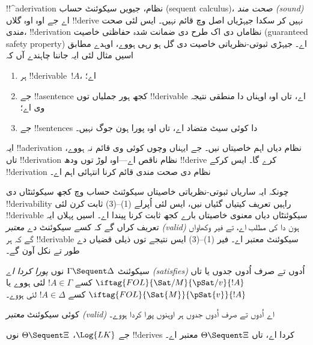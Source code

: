 \documentclass[../../../include/open-logic-section]{subfiles}
\begin{document}
      {}
      {}


\begin{explain}
!!^a{derivation} نظام، جیویں سیکوئنٹ حساب (sequent calculus)، 
\emph{صحت مند (sound)} اے جے اوہ اوہ گلاں !!{derive} نہیں کر سکدا جیہڑیاں
اصل وچ قائم نہیں۔ ایس لئی صحت مندی، !!{derivation} نظاماں دی اک طرح دی
ضمانت شدہ حفاظتی خاصیت (guaranteed safety property) اے۔ جیہڑی
ثبوتی-نظریاتی خاصیت دی گل ہو رہی ہووے، اوہدے مطابق اسیں مثال لئی ایہ جاننا
چاہندے آں کہ
\begin{enumerate}
\item ہر !!{derivable}~$!A$،  اے؛
\item جے !!a{sentence} کجھ ہور جملیاں توں !!{derivable} اے، تاں اوہ اوہناں دا
  منطقی نتیجہ وی اے؛
\item جے !!{sentence}s دا کوئی سیٹ متضاد اے، تاں اوہ پورا ہون جوگ نہیں۔
\end{enumerate}
ایہ !!a{derivation} نظام دیاں اہم خاصیتاں نیں۔ جے ایہناں وچوں کوئی وی
قائم نہ ہووے، تاں !!{derivation} نظام ناقص اے---اوہ لوڑ توں ودھ
!!{derive} کرے گا۔ ایس کرکے !!{derivation} نظام دی صحت مندی قائم کرنا
انتہائی اہم اے۔

چونکہ ایہ ساریاں ثبوتی-نظریاتی خاصیتاں سیکوئنٹ حساب وچ کجھ سیکوئنٹاں دی
!!{derivability} راہیں تعریف کیتیاں گئیاں نیں، ایس لئی اُپرلے (1)--(3)
ثابت کرن لئی !!{derivable} سیکوئنٹاں دیاں معنوی خاصیتاں بارے کجھ ثابت
کرنا پیندا اے۔ اسیں پہلاں ایہ تعریف کراں گے کہ کسے سیکوئنٹ دے
\emph{معتبر (valid)} ہون دا کی مطلب اے، تے فیر وکھاواں گے کہ ہر
!!{derivable} سیکوئنٹ معتبر اے۔ فیر (1)--(3) ایس نتیجے توں ذیلی قضیاں
دے طور تے نکل آون گے۔
\end{explain}

\begin{defn}
 سیکوئنٹ
$\Gamma \Sequent \Delta$ نوں \emph{پورا کردا اے (satisfies)} اُدوں تے صرف اُدوں جدوں یا تاں
$\iftag{FOL}{\Sat/{M}}{\pSat/{v}}{!A}$ کسے $!A \in \Gamma$ لئی ہووے یا
$\iftag{FOL}{\Sat{M}}{\pSat{v}}{!A}$ کسے $!A \in \Delta$ لئی ہووے۔

کوئی سیکوئنٹ \emph{معتبر (valid)} اے اُدوں تے صرف اُدوں جدوں ہر
اوہنوں پورا کردا ہووے۔
\end{defn}

\begin{thm}
 جے $\Log{LK}$، $\Theta
\Sequent \Xi$ نوں !!{derive}s کردا اے، تاں $\Theta \Sequent \Xi$ معتبر اے۔
\end{thm}
\end{document}
